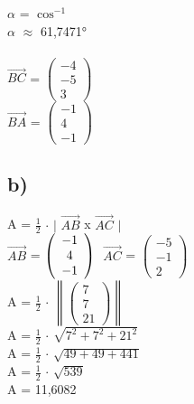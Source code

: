 \documentclass{article}
\begin{document}
	$\alpha$ = $\cos^{-1}$ \\
	$\alpha$ $\approx$ 61,7471° \\ \\
	$\vec{BC}$ = 
	$\left(\begin{array}{c}
	-4 \\ -5 \\ 3
	\end{array}\right)$\\
	$\vec{BA}$ = $\left(\begin{array}{c}
	-1 \\ 4 \\ -1
	\end{array}\right)$ \\
	
	
	\subsection*{b)}
	A = $\frac{1}{2}$ $\cdot$ $|$ $\vec{AB}$ x $\vec{AC}$ $|$ \\
	$\vec{AB}$ = 
	$
	\left(\begin{array}{c}
	-1 \\ 4  \\ -1
	\end{array}\right) \\
	$
	$\vec{AC}$ = 
	$
	\left(\begin{array}{c}
	-5 \\ -1 \\ 2
	\end{array}\right)
	$ \\
	A = $\frac{1}{2}$ $\cdot$
	$
	\left\|\left(\begin{array}{c}
	7 \\ 7 \\ 21
	\end{array}\right)\right\|
	$ \\
	A = $\frac{1}{2}$ $\cdot$ $\sqrt{7^2 + 7^2 + 21^2}$ \\
	A = $\frac{1}{2}$ $\cdot$ $\sqrt{49 + 49 + 441}$ \\
	A = $\frac{1}{2}$ $\cdot$ $\sqrt{539}$ \\
	A = 11,6082
\end{document}
